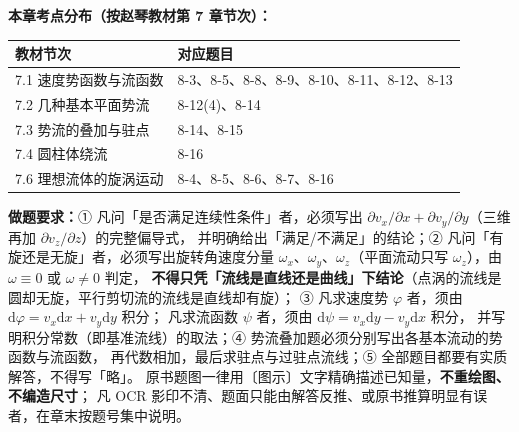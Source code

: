 \begin{tishi}
\textbf{本章考点分布（按赵琴教材第 7 章节次）：}
\begin{tabularx}{\linewidth}{@{}lX@{}}
\toprule
教材节次 & 对应题目 \\
\midrule
7.1 速度势函数与流函数 & 8-3、8-5、8-8、8-9、8-10、8-11、8-12、8-13 \\
7.2 几种基本平面势流 & 8-12(4)、8-14 \\
7.3 势流的叠加与驻点 & 8-14、8-15 \\
7.4 圆柱体绕流 & 8-16 \\
7.6 理想流体的旋涡运动 & 8-4、8-5、8-6、8-7、8-16 \\
\bottomrule
\end{tabularx}

\textbf{做题要求：}① 凡问「是否满足连续性条件」者，必须写出
$\partial v_x/\partial x+\partial v_y/\partial y$（三维再加 $\partial v_z/\partial z$）的完整偏导式，
并明确给出「满足/不满足」的结论；② 凡问「有旋还是无旋」者，必须写出旋转角速度分量
$\omega_x$、$\omega_y$、$\omega_z$（平面流动只写 $\omega_z$），由 $\omega\equiv0$ 或 $\omega\neq0$ 判定，
\textbf{不得只凭「流线是直线还是曲线」下结论}（点涡的流线是圆却无旋，平行剪切流的流线是直线却有旋）；
③ 凡求速度势 $\varphi$ 者，须由 $\mathrm{d}\varphi=v_x\mathrm{d}x+v_y\mathrm{d}y$ 积分；
凡求流函数 $\psi$ 者，须由 $\mathrm{d}\psi=v_x\mathrm{d}y-v_y\mathrm{d}x$ 积分，
并写明积分常数（即基准流线）的取法；④ 势流叠加题必须分别写出各基本流动的势函数与流函数，
再代数相加，最后求驻点与过驻点流线；⑤ 全部题目都要有实质解答，不得写「略」。
原书题图一律用〔图示〕文字精确描述已知量，\textbf{不重绘图、不编造尺寸}；
凡 OCR 影印不清、题面只能由解答反推、或原书推算明显有误者，在章末按题号集中说明。
\end{tishi}

